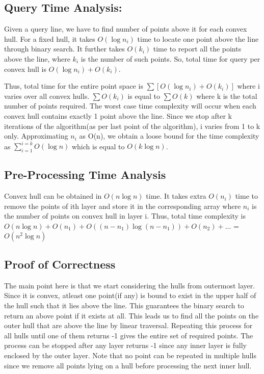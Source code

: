 \documentclass{article}
\begin{document}
\subsection{Query Time Analysis:}
Given a query line, we have to find number of points above it for each convex hull. For a fixed hull, it takes $O(\log n_i)$ time to locate one point above the line through binary search. It further takes $O(k_i)$ time to report all the points above the line, where $k_i$ is the number of such points. So, total time for  query per convex hull is $O(\log n_i) + O(k_i)$.
\par
Thus, total time for the entire point space is $\sum [O(\log n_i) + O(k_i)]$ where i varies over all convex hulls. $\sum O(k_i)$ is equal to $\sum O(k)$ where k is the total number of points required. The worst case time complexity will occur when each convex hull contains exactly 1 point above the line. Since we stop after k iterations of the algorithm(as per last point of the algorithm), i varies from 1 to k only. Approximating $n_i$ as O(n), we obtain a loose bound for the time complexity as $ \sum_{i=1}^{i=k} O(\log n)$ which is equal to $O(k \log n)$.

\subsection{Pre-Processing Time Analysis}
Convex hull can be obtained in $O(n\log n)$ time. It takes extra $O(n_i)$ time to remove the points of ith layer and store it in the corresponding array where $n_i$ is the number of points on convex hull in layer i. Thus, total time complexity is  $O(n\log n) + O(n_1) + O((n-n_1)\log (n-n_1)) + O(n_2) + ...$ = $O(n^2\log n)$

\subsection{Proof of Correctness}
The main point here is that we start considering the hulls from outermost layer. Since it is convex, atleast one point(if any) is bound to exist in the upper half of the hull such that it lies above the line. This guarantees the binary search to return an above point if it exists at all. This leads us to find all the points on the outer hull that are above the line by linear traversal. Repeating this process for all hulls until one of them returns -1 gives the entire set of required points. The process can be stopped after any layer returns -1 since any inner layer is fully enclosed by the outer layer. Note that no point can be repeated in multiple hulls since we remove all points lying on a hull before processing the next inner hull.
\newpage
\end{document}

